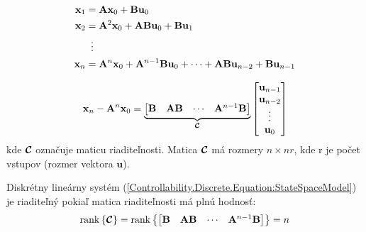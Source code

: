 \documentclass[a4paper, 10pt, ]{article}
\begin{document}
\begin{subequations}
    \begin{align}
        \bm{x}_{1} &= \bm{A} \bm{x}_{0} + \bm{B} \bm{u}_{0} \\
        \bm{x}_{2} &= \bm{A}^2 \bm{x}_{0} + \bm{A} \bm{B} \bm{u}_{0} + \bm{B} \bm{u}_{1} \\
        &\vdotswithin{=} \nonumber \\
        \bm{x}_{n} &= \bm{A}^{n} \bm{x}_{0} + \bm{A}^{n - 1} \bm{B} \bm{u}_{0} + \cdots + \bm{A} \bm{B} \bm{u}_{n - 2} + \bm{B} \bm{u}_{n - 1}
    \end{align}
\end{subequations}

\begin{equation}
    \label{Controllability.Discrete.Equation:ControllabilityEquation}
    \mathbf{x}_{n} - \mathbf{A}^{n} \mathbf{x}_{0} = 
    \underbrace{
        \begin{bmatrix}
            \mathbf{B} & \mathbf{A} \mathbf{B} & \cdots & \mathbf{A}^{n - 1} \mathbf{B}
        \end{bmatrix}
    }_{\boldsymbol{\mathcal{C}}}
    \begin{bmatrix}
        \mathbf{u}_{n - 1} \\
        \mathbf{u}_{n - 2} \\
        \vdots         \\
        \mathbf{u}_{0}     \\
    \end{bmatrix}
\end{equation}
kde $\boldsymbol{\mathcal{C}}$ označuje maticu riaditeľnosti. Matica $\boldsymbol{\mathcal{C}}$ má rozmery $n \times nr$, kde r je počet vstupov (rozmer vektora $\bm{u}$). 

\begin{theorem}
    Diskrétny lineárny systém (\ref{Controllability.Discrete.Equation:StateSpaceModel}) je riaditeľný pokiaľ matica riaditeľnosti má plnú hodnosť:
    \begin{equation}
        \label{Controllability.Discrete.Equation:ControllabilityTheorem}
        \mathrm{rank} \left\{ \boldsymbol{\mathcal{C}} \right\} = 
        \mathrm{rank} \left\{
            \begin{bmatrix}
                \mathbf{B} & \mathbf{A} \mathbf{B} & \cdots & \mathbf{A}^{n - 1} \mathbf{B}
            \end{bmatrix}
        \right\} = 
        n
    \end{equation}
\end{theorem}
\end{document}
